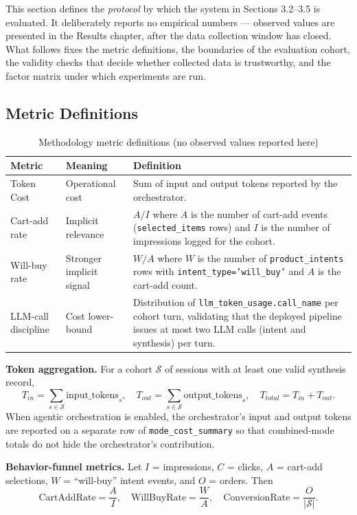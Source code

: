This section defines the \emph{protocol} by which the system in Sections 3.2--3.5 is evaluated. It deliberately reports no empirical numbers --- observed values are presented in the Results chapter, after the data collection window has closed. What follows fixes the metric definitions, the boundaries of the evaluation cohort, the validity checks that decide whether collected data is trustworthy, and the factor matrix under which experiments are run.

\subsection{Metric Definitions}

\begin{table}[H]
\centering
\begin{tabular}{p{2.8cm}p{4.5cm}p{6.4cm}}
\toprule
\textbf{Metric} & \textbf{Meaning} & \textbf{Definition}\\
\midrule
Token Cost   & Operational cost          & Sum of input and output tokens reported by the orchestrator.\\
Cart-add rate & Implicit relevance       & $A/I$ where $A$ is the number of cart-add events (\texttt{selected\_items} rows) and $I$ is the number of impressions logged for the cohort.\\
Will-buy rate & Stronger implicit signal & $W/A$ where $W$ is the number of \texttt{product\_intents} rows with \texttt{intent\_type='will\_buy'} and $A$ is the cart-add count.\\
LLM-call discipline & Cost lower-bound  & Distribution of \texttt{llm\_token\_usage.call\_name} per cohort turn, validating that the deployed pipeline issues at most two LLM calls (intent and synthesis) per turn.\\
\bottomrule
\end{tabular}
\caption{Methodology metric definitions (no observed values reported here)}
\label{tab:metric_definitions}
\end{table}

\textbf{Token aggregation.}
For a cohort $\mathcal{S}$ of sessions with at least one valid synthesis record,
\begin{equation}
T_{in}=\sum_{s\in\mathcal{S}}\text{input\_tokens}_s,\quad
T_{out}=\sum_{s\in\mathcal{S}}\text{output\_tokens}_s,\quad
T_{total}=T_{in}+T_{out}.
\end{equation}
When agentic orchestration is enabled, the orchestrator's input and output tokens are reported on a separate row of \texttt{mode\_cost\_summary} so that combined-mode totals do not hide the orchestrator's contribution.

\textbf{Behavior-funnel metrics.}
Let $I$ = impressions, $C$ = clicks, $A$ = cart-add selections, $W$ = ``will-buy'' intent events, and $O$ = orders. Then
\begin{equation}
\text{CartAddRate}=\frac{A}{I},\quad
\text{WillBuyRate}=\frac{W}{A},\quad
\text{ConversionRate}=\frac{O}{|\mathcal{S}|}.
\end{equation}


